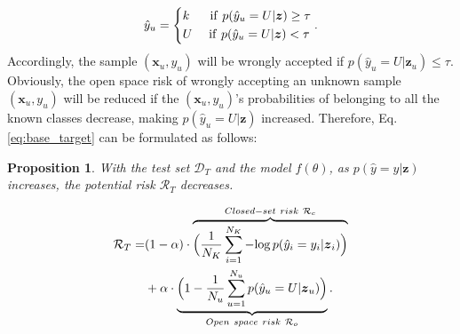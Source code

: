 \documentclass[letterpaper]{article} %
\newtheorem{proposition}{Proposition}
\begin{document}
\begin{equation}
\hat{y}_u=\left\{\begin{aligned}
        &k\ \ \quad{\rm{if}}\ p(\hat{y}_u=U|\boldsymbol{z})\geq\tau\\
        &U\,\,\quad{\rm{if}}\ p(\hat{y}_u=U|\boldsymbol{z})<\tau
    \end{aligned}\right..
\label{eq:rej_unknown}
\end{equation}
Accordingly, the sample $(\boldsymbol{x}_u,y_u)$ will be wrongly accepted if $p(\hat{y}_u=U|\boldsymbol{z}_u)\leq\tau$.
Obviously, the open space risk of wrongly accepting an unknown sample $(\boldsymbol{x}_u,y_u)$ will be reduced if the $(\boldsymbol{x}_u,y_u)$'s probabilities of belonging to all the known classes decrease, making
$p(\hat{y}_u=U|\boldsymbol{z})$ increased. Therefore, Eq. \eqref{eq:base_target} can be formulated as follows:

\begin{proposition}
With the test set $\mathcal{D}_T$ and the model $f(\theta)$, as $p(\hat{y}=y|\boldsymbol{z})$ increases, the potential risk $\mathcal{R}_T$ decreases.
\end{proposition}

\begin{equation}
\begin{aligned}
\mathcal{R}_T=&(1-\alpha)\cdot\overbrace{\Big(\frac1{N_K}\sum^{N_K}_{i=1}-{\rm log}\,p(\hat{y}_i=y_i|\boldsymbol{z}_i)\Big)}^{Closed-set\ risk\ \mathcal{R}_c}\\&+\alpha\cdot\underbrace{\Big(1-\frac{1}{N_u}\sum_{u=1}^{N_u}p(\hat{y}_u=U|\boldsymbol{z}_u)\Big)}_{Open\ space\ risk\ \mathcal{R}_o}.
\label{eq:potential_risk}
\end{aligned}
\end{equation}
\end{document}
